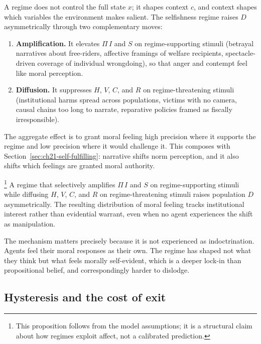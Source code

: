 A regime does not control the full state $x$; it shapes context $c$, and context shapes which variables the environment makes salient.
The selfishness regime raises $D$ asymmetrically through two complementary moves:
\begin{enumerate}[nosep]
  \item \textbf{Amplification.} It elevates $\Pi\,I$ and $S$ on regime-supporting stimuli (betrayal narratives about free-riders, affective framings of welfare recipients, spectacle-driven coverage of individual wrongdoing), so that anger and contempt feel like moral perception.
  \item \textbf{Diffusion.} It suppresses $H$, $V$, $C$, and $R$ on regime-threatening stimuli (institutional harms spread across populations, victims with no camera, causal chains too long to narrate, reparative policies framed as fiscally irresponsible).
\end{enumerate}
The aggregate effect is to grant moral feeling high precision where it supports the regime and low precision where it would challenge it.
This composes with Section~\ref{sec:ch21-self-fulfilling}: narrative shifts norm perception, and it also shifts which feelings are granted moral authority.

\begin{proposition}\footnote{This proposition follows from the model assumptions; it is a structural claim about how regimes exploit affect, not a calibrated prediction.}
\label{prop:affective-recruitment}
A regime that selectively amplifies $\Pi\,I$ and $S$ on regime-supporting stimuli while diffusing $H$, $V$, $C$, and $R$ on regime-threatening stimuli raises population $D$ asymmetrically.
The resulting distribution of moral feeling tracks institutional interest rather than evidential warrant, even when no agent experiences the shift as manipulation.
\end{proposition}

The mechanism matters precisely because it is not experienced as indoctrination.
Agents feel their moral responses as their own.
The regime has shaped not what they think but what feels morally self-evident, which is a deeper lock-in than propositional belief, and correspondingly harder to dislodge.

\subsection{Hysteresis and the cost of exit}

